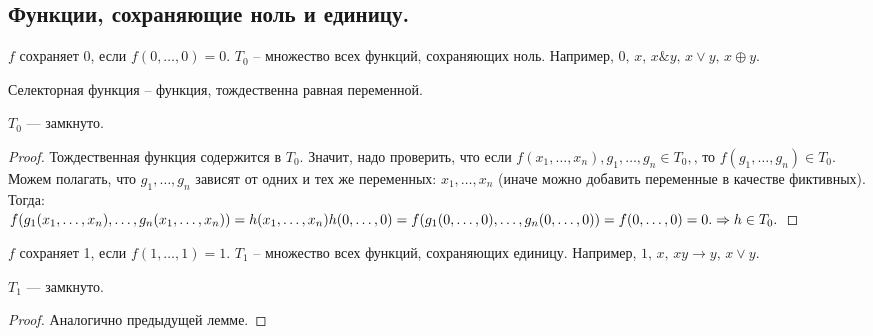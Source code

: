 \subsection{Функции, сохраняющие ноль и единицу. }
\begin{definition}
	$f$ сохраняет 0, если $f(0,\ldots, 0)=0$.
	$T_0$ -- множество всех функций, сохраняющих ноль. Например, $0,\,x,\,x \& y,\, x \vee y,\, x \oplus y$.
\end{definition}
\begin{definition}
	Селекторная функция -- функция, тождественна равная переменной. 
\end{definition}
\begin{lemma}
	$T_0 $ --- замкнуто. 
\end{lemma}
\begin{proof}
	Тождественная функция содержится в $T_0$. Значит, надо проверить, что если $f(x_1,\ldots, x_n),g_1, \ldots, g_n \in T_0, \text{, то~} f(g_1, \ldots, g_n) \in T_0.$ \\
	Можем полагать, что $g_1, \ldots, g_n$ зависят от одних и тех же переменных: $x_1, \ldots, x_n$ (иначе можно добавить переменные в качестве фиктивных). Тогда:\\
	$f(g_1(x_1, \ldots, x_n),\ldots, g_n(x_1, \ldots, x_n))=h(x_1, \ldots, x_n) \\
	h(0, \ldots, 0)=f(g_1(0,\ldots,0),\ldots,g_n(0, \ldots, 0))=f(0,\ldots,0)=0. \Rightarrow h \in T_0. 
$
\end{proof}
\begin{definition}
	$f$ сохраняет 1, если $f(1,\ldots, 1)=1$.
	$T_1$ -- множество всех функций, сохраняющих единицу. Например, $1,\,x,\,xy\rightarrow y, \,x \vee y$.
\end{definition}
\begin{lemma}
	$T_1 $ --- замкнуто. 
\end{lemma}
\begin{proof}
	Аналогично предыдущей лемме. 
\end{proof}

